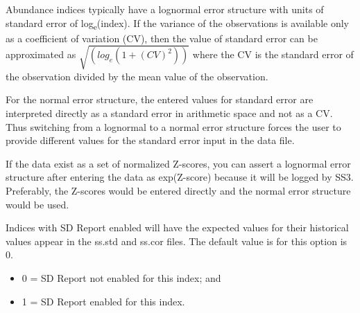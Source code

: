 Abundance indices typically have a lognormal error structure with units of standard error of log\textsubscript{e}(index). If the variance of the observations is available only as a coefficient of variation (CV), then the value of standard error can be approximated as $\sqrt{(log_e(1+(CV)^2))}$ where the CV is the standard error of the observation divided by the mean value of the observation.

For the normal error structure, the entered values for standard error are interpreted directly as a standard error in arithmetic space and not as a CV. Thus switching from a lognormal to a normal error structure forces the user to provide different values for the standard error input in the data file.

If the data exist as a set of normalized Z-scores, you can assert a lognormal error structure after entering the data as exp(Z-score) because it will be logged by SS3. Preferably, the Z-scores would be entered directly and the normal error structure would be used.

Indices with SD Report enabled will have the expected values for their historical values appear in the ss.std and ss.cor files. The default value is for this option is 0.
	\begin{itemize}
		\item 0 = SD Report not enabled for this index; and
		\item 1 = SD Report enabled for this index.
	\end{itemize}


